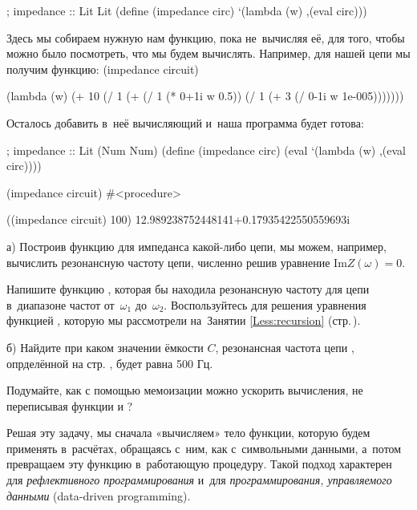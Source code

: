 \begin{Definition}[emph={w,circ}]
; impedance :: Lit \arrow Lit
(define (impedance circ)
  `(lambda (w) ,(eval circ)))
\end{Definition}

Здесь мы собираем нужную нам функцию, пока не~вычисляя её, для того, чтобы можно было посмотреть, что мы будем вычислять. Например, для нашей цепи мы получим функцию:
\REPLin
  {(impedance circuit)}
\begin{mREPLout}
  (lambda (w)
    (+ 10 (/ 1 (+ (/ 1 (* 0+1i w 0.5))
               (/ 1 (+ 3 (/ 0-1i w 1e-005)))))))  
\end{mREPLout}

Осталось добавить в~неё вычисляющий  и~наша программа будет готова:

\begin{Definition}[emph={w,circ}]
; impedance :: Lit \arrow (Num \arrow Num)
(define (impedance circ)
  (eval `(lambda (w) ,(eval circ))))
\end{Definition}

\REPL
  {(impedance circuit)}
  {\#<procedure>}

\REPL
  {((impedance circuit) 100)}
  {12.989238752448141+0.17935422550559693i}

\newpage
\begin{Assignment}

а) Построив функцию для импеданса какой-либо цепи, мы можем, например, вычислить резонансную частоту цепи, численно решив уравнение $\mathrm{Im} Z(\omega) = 0$.

Напишите функцию , которая бы находила резонансную частоту для цепи  в~диапазоне частот от~$\omega_1$ до~$\omega_2$. Воспользуйтесь для решения уравнения функцией , которую мы рассмотрели на~Занятии \ref{Less:recursion}  (стр.\,\pageref{bisection}).

б) Найдите при каком значении ёмкости $C$, резонансная частота цепи , опрделённой на стр. \pageref{circuit}, будет равна 500 Гц. 

Подумайте, как с помощью мемоизации можно ускорить вычисления, не переписывая функции  и ?
\end{Assignment}

Решая эту задачу, мы сначала «вычисляем» тело функции, которую будем применять в~расчётах, обращаясь с~ним, как с~символьными данными, а~потом превращаем эту функцию в~работающую процедуру. Такой подход характерен для \emph{рефлективного программирования} и~для \emph{программирования, управляемого данными} (data-driven programming).

